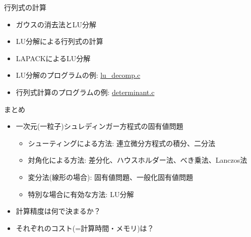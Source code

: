 \documentclass[dvipdfmx]{beamer}
\begin{document}
\begin{frame}[t,fragile]{行列式の計算}
  \begin{itemize}
    \setlength{\itemsep}{1em}
  \item ガウスの消去法とLU分解
  \item LU分解による行列式の計算
  \item LAPACKによるLU分解
  \item LU分解のプログラムの例: \href{https://github.com/todo-group/computer-experiments/blob/master/exercise/linear_system/lu_decomp.c}{lu\_decomp.c}
  \item 行列式計算のプログラムの例: \href{https://github.com/todo-group/computer-experiments/blob/master/exercise/linear_system/determinant.c}{determinant.c}
  \end{itemize}
\end{frame}








\begin{frame}[t,fragile]{まとめ}
  \begin{itemize}
    \setlength{\itemsep}{1em}
  \item 一次元(一粒子)シュレディンガー方程式の固有値問題
    \begin{itemize}
    \item シューティングによる方法: 連立微分方程式の積分、二分法
    \item 対角化による方法: 差分化、ハウスホルダー法、べき乗法、Lanczos法
    \item 変分法(線形の場合): 固有値問題、一般化固有値問題
    \item 特別な場合に有効な方法: LU分解
    \end{itemize}
  \item 計算精度は何で決まるか？
  \item それぞれのコスト(=計算時間・メモリ)は？
  \end{itemize}
\end{frame}
\end{document}
